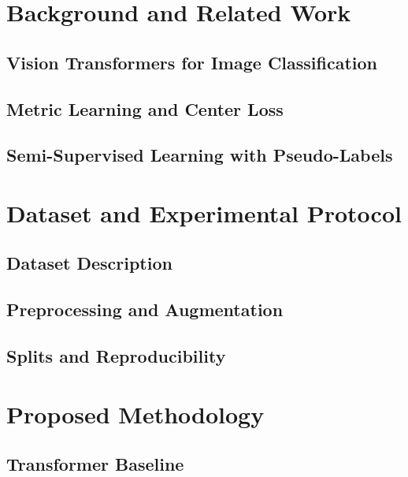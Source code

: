\documentclass[12pt, a4paper, oneside]{teza-upb_en}
\begin{document}
\chapter{Background and Related Work}
\section{Vision Transformers for Image Classification}

\section{Metric Learning and Center Loss}

\section{Semi-Supervised Learning with Pseudo-Labels}

\chapter{Dataset and Experimental Protocol}
\section{Dataset Description}

\section{Preprocessing and Augmentation}

\section{Splits and Reproducibility}

\chapter{Proposed Methodology}
\section{Transformer Baseline}
\end{document}

